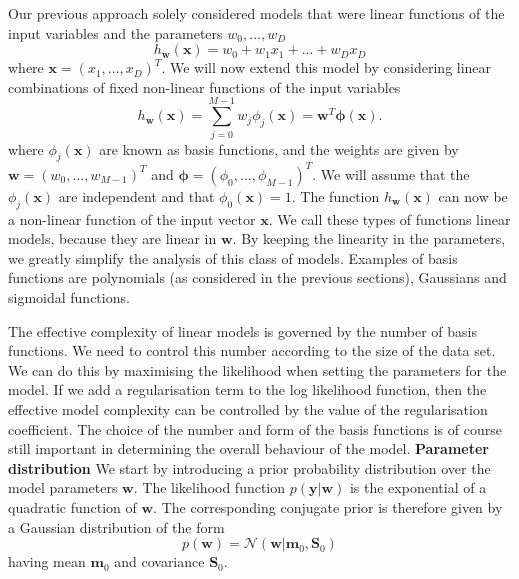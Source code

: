 \documentclass[english]{article}
\begin{document}
Our previous approach solely considered models that were linear functions of the input variables and the parameters $w_0, \ldots, w_D$ 
\[h_\textbf{w}(\textbf{x})=w_0 +w_1x_1 +...+w_Dx_D \]
where $\textbf{x} = (x_1, \ldots, x_D )^T$. We will now extend this model by considering linear combinations of fixed non-linear functions of the input variables
\begin{equation}\label{linearmodel}
	 h_\textbf{w}(\textbf{x})= \sum_{j=0}^{M-1} w_j \phi_j(\textbf{x}) = \textbf{w}^T \mathbf{\phi}(\textbf{x}).
\end{equation}
where $\phi_j (\textbf{x})$ are known as basis functions, and the weights are given by $\textbf{w} = (w_0,\ldots ,w_{M-1})^T$ and $\mathbf{\phi} = (\phi_0,\ldots ,\phi_{M-1})^T$. We will assume that the $\phi_j(\textbf{x})$ are independent and that $\phi_0(\textbf{x})=1$.
The function $h_\textbf{w}(\textbf{x})$ can now be a non-linear function of the input vector $\textbf{x}$. We call these types of functions linear models, because they are linear in $\textbf{w}$. By keeping the linearity in the parameters, we greatly simplify the analysis of this class of models. Examples of basis functions are polynomials (as considered in the previous sections), Gaussians and sigmoidal functions.

The effective complexity of linear models is governed by the number of basis functions. We need to control this number according to the size of the data set. We can do this by maximising the likelihood when setting the parameters for the model. If we add a regularisation term to the log likelihood function, then the effective model complexity can be controlled by the value of the regularisation coefficient. The choice of the number and form of the basis functions is of course still important in determining the overall behaviour of the model.\newline\newline
\textbf{Parameter distribution}\newline
We start by introducing a prior probability distribution over the model parameters $\textbf{w}$. The likelihood function $p(\textbf{y}|\textbf{w})$ is the exponential of a quadratic function of $\textbf{w}$. The corresponding conjugate prior is therefore given by a Gaussian distribution of the form
\begin{equation}
	p(\textbf{w}) = \mathcal{N} (\textbf{w}|\textbf{m}_0, \textbf{S}_0)
\end{equation}
having mean $\textbf{m}_0$ and covariance $\textbf{S}_0$.
\end{document}
